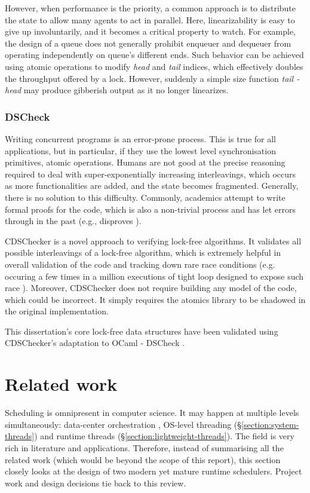 \documentclass[12pt,a4paper,twoside]{report}
\begin{document}
However, when performance is the priority, a common approach is to distribute the state to allow many agents to act in parallel. Here, linearizability is easy to give up involuntarily, and it becomes a critical property to watch. For example, the design of a queue does not generally prohibit enqueuer and dequeuer from operating independently on queue's different ends. Such behavior can be achieved using atomic operations to modify \textit{head} and \textit{tail} indices, which effectively doubles the throughput offered by a lock. However, suddenly a simple size function \textit{tail - head} may produce gibberish output as it no longer linearizes. 

\subsection{DSCheck}
\label{section:background_dscheck}
Writing concurrent programs is an error-prone process. This is true for all applications, but in particular, if they use the lowest level synchronisation primitives, atomic operations. Humans are not good at the precise reasoning required to deal with super-exponentially increasing interleavings, which occurs as more functionalities are added, and the state becomes fragmented. Generally, there is no solution to this difficulty. Commonly, academics attempt to write formal proofs for the code, which is also a non-trivial process and has let errors through in the past (e.g., \cite{Norris2013} disproves \cite{correct_and_efficiect_deque}). 

CDSChecker \cite{Norris2013} is a novel approach to verifying lock-free algorithms. It validates all possible interleavings of a lock-free algorithm, which is extremely helpful in overall validation of the code and tracking down rare race conditions (e.g. occuring a few times in a million executions of tight loop designed to expose such race \cite{litmus}). Moreover, CDSChecker does not require building any model of the code, which could be incorrect. It simply requires the atomics library to be shadowed in the original implementation.

This dissertation's core lock-free data structures have been validated using CDSChecker's adaptation to OCaml - DSCheck \cite{sadiqjds97:online}. 


\chapter{Related work}

Scheduling is omnipresent in computer science. It may happen at multiple levels simultaneously: data-center orchestration \cite{NomadbyH95:online}, OS-level threading (\S\ref{section:system-threads}) and runtime threads (\S\ref{section:lightweight-threads}). The field is very rich in literature and applications. Therefore, instead of summarising all the related work (which would be beyond the scope of this report), this section closely looks at the design of two modern yet mature runtime schedulers. Project work and design decisions tie back to this review. 
\end{document}

